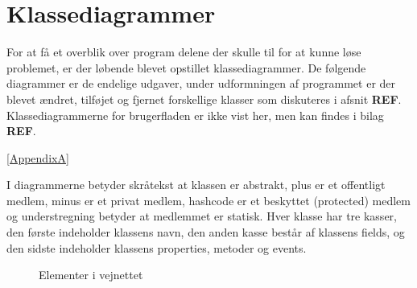 \section{Klassediagrammer}\label{Klassediagrammer}
For at få et overblik over program delene der skulle til for at kunne løse problemet, er der løbende blevet opstillet klassediagrammer. De følgende diagrammer er de endelige udgaver, under udformningen af programmet er der blevet ændret, tilføjet og fjernet forskellige klasser som diskuteres i afsnit \textbf{REF}. Klassediagrammerne for brugerfladen er ikke vist her, men kan findes i bilag \textbf{REF}.

\ref{AppendixA}

\vspace{5mm}

I diagrammerne betyder skråtekst at klassen er abstrakt, plus er et offentligt medlem, minus er et privat medlem, hashcode er et beskyttet (protected) medlem og understregning betyder at medlemmet er statisk. Hver klasse har tre kasser, den første indeholder klassens navn, den anden kasse består af klassens fields, og den sidste indeholder klassens properties, metoder og events.

\begin{figure}[H]
    \centering
    \caption{Elementer i vejnettet}
    \label{kdVejElementer}
\end{figure}

